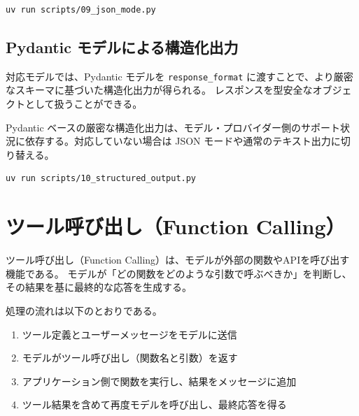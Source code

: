 \documentclass[a4paper,11pt]{ltjsarticle}
\newcommand{\code}[1]{\texttt{#1}}
\begin{document}
\begin{lstlisting}[style=bash]
uv run scripts/09_json_mode.py
\end{lstlisting}

\subsection{Pydantic モデルによる構造化出力}
\label{subsec:pydantic}

対応モデルでは、Pydantic モデルを \code{response\_format} に渡すことで、より厳密なスキーマに基づいた構造化出力が得られる。
レスポンスを型安全なオブジェクトとして扱うことができる。



\begin{notebox}[注意]
Pydantic ベースの厳密な構造化出力は、モデル・プロバイダー側のサポート状況に依存する。対応していない場合は JSON モードや通常のテキスト出力に切り替える。
\end{notebox}

\begin{lstlisting}[style=bash]
uv run scripts/10_structured_output.py
\end{lstlisting}


\section{ツール呼び出し（Function Calling）}
\label{sec:tool_calling}

ツール呼び出し（Function Calling）は、モデルが外部の関数やAPIを呼び出す機能である。
モデルが「どの関数をどのような引数で呼ぶべきか」を判断し、その結果を基に最終的な応答を生成する。

処理の流れは以下のとおりである。

\begin{enumerate}
  \item ツール定義とユーザーメッセージをモデルに送信
  \item モデルがツール呼び出し（関数名と引数）を返す
  \item アプリケーション側で関数を実行し、結果をメッセージに追加
  \item ツール結果を含めて再度モデルを呼び出し、最終応答を得る
\end{enumerate}


\end{document}
